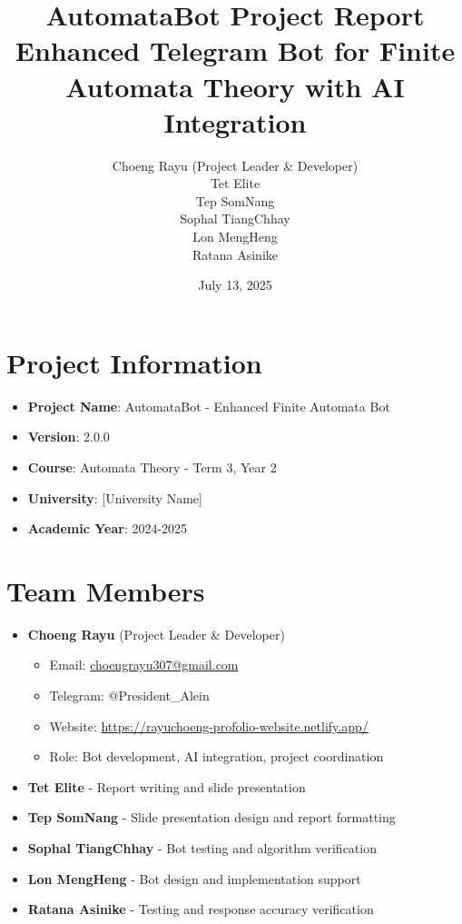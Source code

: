 \documentclass[12pt]{article}
\title{AutomataBot Project Report \\ \large Enhanced Telegram Bot for Finite Automata Theory with AI Integration}
\author{
    Choeng Rayu (Project Leader \& Developer) \\
    Tet Elite \\
    Tep SomNang \\
    Sophal TiangChhay \\
    Lon MengHeng \\
    Ratana Asinike
}
\date{July 13, 2025}
\begin{document}
\maketitle

\section*{Project Information}
\begin{itemize}
    \item \textbf{Project Name}: AutomataBot - Enhanced Finite Automata Bot
    \item \textbf{Version}: 2.0.0
    \item \textbf{Course}: Automata Theory - Term 3, Year 2
    \item \textbf{University}: [University Name]
    \item \textbf{Academic Year}: 2024-2025
\end{itemize}

\section*{Team Members}
\begin{itemize}
    \item \textbf{Choeng Rayu} (Project Leader \& Developer)
    \begin{itemize}
        \item Email: \href{mailto:choengrayu307@gmail.com}{choengrayu307@gmail.com}
        \item Telegram: @President\_Alein
        \item Website: \href{https://rayuchoeng-profolio-website.netlify.app/}{https://rayuchoeng-profolio-website.netlify.app/}
        \item Role: Bot development, AI integration, project coordination
    \end{itemize}
    \item \textbf{Tet Elite} - Report writing and slide presentation
    \item \textbf{Tep SomNang} - Slide presentation design and report formatting
    \item \textbf{Sophal TiangChhay} - Bot testing and algorithm verification
    \item \textbf{Lon MengHeng} - Bot design and implementation support
    \item \textbf{Ratana Asinike} - Testing and response accuracy verification
\end{itemize}
\end{document}

